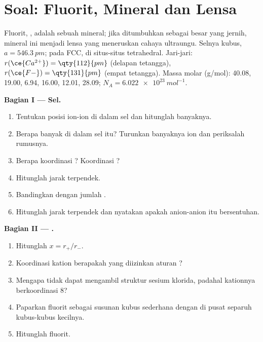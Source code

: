\section{Soal: Fluorit, Mineral dan Lensa}

\begin{problem}
\label{pb:b1:crystals-ionic-covalent:1}
Fluorit, , adalah sebuah mineral; jika ditumbuhkan sebagai 
besar yang jernih, mineral ini menjadi lensa yang meneruskan cahaya
ultraungu. Selnya kubus, $a =
\qty{546.3}{pm}$;  pada 
FCC,  di situs-situs tetrahedral. Jari-jari: $r(\ce{Ca^{2+}}) = \qty{112}{pm}$ (delapan tetangga), $r(\ce{F-}) = \qty{131}{pm}$ (empat
tetangga). Massa molar (g/mol):  40.08,  19.00, 
6.94,  16.00,  12.01,  28.09;
$N_A = \qty{6.022e23}{mol^{-1}}$.

\medskip
\noindent\textbf{Bagian I --- Sel.}
\begin{enumerate}
  \item Tentukan posisi ion-ion  di dalam sel dan hitunglah
        banyaknya.
  \item Berapa banyak  di dalam sel itu? Turunkan
        banyaknya ion  dan periksalah rumusnya.
  \item Berapa koordinasi ? Koordinasi ?
  \item Hitunglah jarak  terpendek.
  \item Bandingkan dengan jumlah .
  \item Hitunglah jarak  terpendek dan nyatakan apakah
        anion-anion itu bersentuhan.
\end{enumerate}

\medskip
\noindent\textbf{Bagian II --- .}
\begin{enumerate}[resume]
  \item Hitunglah $x = r_+/r_-$.
  \item Koordinasi kation berapakah yang diizinkan aturan ?
  \item Mengapa  tidak dapat mengambil struktur sesium klorida,
        padahal kationnya berkoordinasi 8?
  \item Paparkan fluorit sebagai susunan kubus sederhana  dengan
         di pusat separuh kubus-kubus kecilnya.
  \item Hitunglah  fluorit.
\end{enumerate}


\end{problem}
